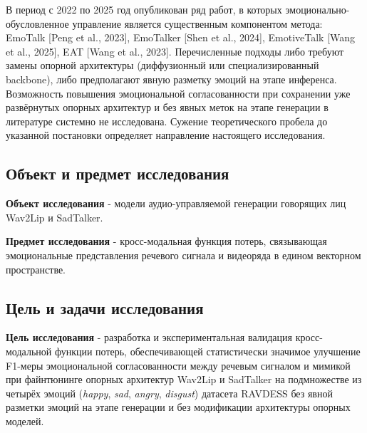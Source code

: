 \documentclass[a4paper, 12pt, oneside, openany]{article}
\begin{document}
В период с 2022 по 2025 год опубликован ряд работ, в которых эмоционально-обусловленное управление является существенным компонентом метода: EmoTalk [Peng et al., 2023], EmoTalker [Shen et al., 2024], EmotiveTalk [Wang et al., 2025], EAT [Wang et al., 2023]. Перечисленные подходы либо требуют замены опорной архитектуры (диффузионный или специализированный backbone), либо предполагают явную разметку эмоций на этапе инференса. Возможность повышения эмоциональной согласованности при сохранении уже развёрнутых опорных архитектур и без явных меток на этапе генерации в литературе системно не исследована. Сужение теоретического пробела до указанной постановки определяет направление настоящего исследования.

\subsection{Объект и предмет исследования}

\textbf{Объект исследования} - модели аудио-управляемой генерации говорящих лиц Wav2Lip и SadTalker.

\textbf{Предмет исследования} - кросс-модальная функция потерь, связывающая эмоциональные представления речевого сигнала и видеоряда в едином векторном пространстве.

\subsection{Цель и задачи исследования}

\textbf{Цель исследования} - разработка и экспериментальная валидация кросс-модальной функции потерь, обеспечивающей статистически значимое улучшение F1-меры эмоциональной согласованности между речевым сигналом и мимикой при файнтюнинге опорных архитектур Wav2Lip и SadTalker на подмножестве из четырёх эмоций (\textit{happy}, \textit{sad}, \textit{angry}, \textit{disgust}) датасета RAVDESS без явной разметки эмоций на этапе генерации и без модификации архитектуры опорных моделей.
\end{document}
